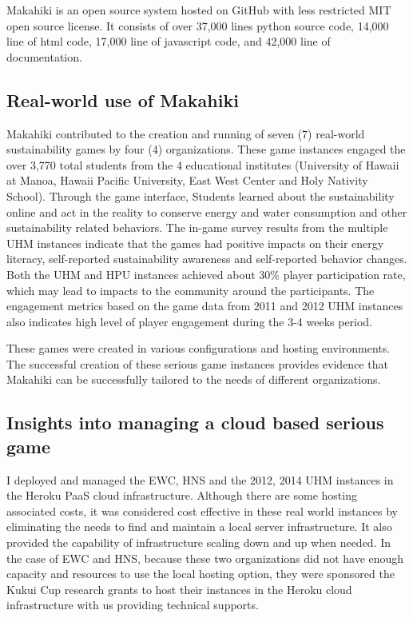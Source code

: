 Makahiki is an open source system hosted on GitHub \cite{makahiki2} with less restricted MIT open source license. It  consists of over 37,000 lines python source code, 14,000 line of html code,  17,000 line of javascript code, and 42,000 line of documentation. 

\subsection{Real-world use of Makahiki}

Makahiki contributed to the creation and running of seven (7) real-world sustainability games by four (4) organizations. These game instances engaged the over 3,770 total students from the 4 educational institutes (University of Hawaii at Manoa, Hawaii Pacific University, East West Center and Holy Nativity School). Through the game interface, Students learned about the sustainability online and act in the reality to conserve energy and water consumption and other sustainability related behaviors. The in-game survey results from the multiple UHM instances indicate that the games had positive impacts on their energy literacy, self-reported sustainability awareness and self-reported behavior changes. Both the UHM and HPU instances achieved about 30\% player participation rate, which may lead to impacts to the community around the participants. The engagement metrics based on the game data from 2011 and 2012 UHM instances also indicates high level of player engagement during the 3-4 weeks period.

These games were created in various configurations and hosting environments. The successful creation of these serious game instances provides evidence that Makahiki can be successfully tailored to the needs of different organizations.


\subsection{Insights into managing a cloud based serious game}

I deployed and managed the EWC, HNS and the 2012, 2014 UHM instances in the Heroku PaaS cloud infrastructure. Although there are some hosting associated costs, it was considered cost effective in these real world instances by eliminating the needs to find and maintain a local server infrastructure. It also provided the capability of infrastructure scaling down and up when needed. In the case of EWC and HNS, because these two organizations did not have enough capacity and resources to use the local hosting option, they were  sponsored the Kukui Cup research grants to host their instances in the Heroku cloud infrastructure with us providing technical supports. 

